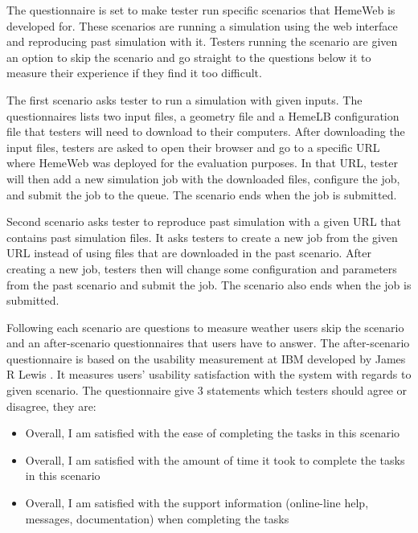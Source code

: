 The questionnaire is set to make tester run specific scenarios that HemeWeb is developed for. These scenarios are running a simulation using the web interface and reproducing past simulation with it. Testers running the scenario are given an option to skip the scenario and go straight to the questions below it to measure their experience if they find it too difficult. 

The first scenario asks tester to run a simulation with given inputs. The questionnaires lists two input files, a geometry file and a HemeLB configuration file that testers will need to download to their computers. After downloading the input files, testers are asked to open their browser and go to a specific URL where HemeWeb was deployed for the evaluation purposes. In that URL, tester will then add a new simulation job with the downloaded files, configure the job, and submit the job to the queue. The scenario ends when the job is submitted.

Second scenario asks tester to reproduce past simulation with a given URL that contains past simulation files. It asks testers to create a new job from the given URL instead of using files that are downloaded in the past scenario. After creating a new job, testers then will change some configuration and parameters from the past scenario and submit the job. The scenario also ends when the job is submitted.

Following each scenario are questions to measure weather users skip the scenario and an after-scenario questionnaires that users have to answer. The after-scenario questionnaire is based on the usability measurement at IBM developed by James R Lewis \citep{lewis1995ibm}.  It measures users' usability satisfaction with the system with regards to given scenario. The questionnaire give 3 statements which testers should agree or disagree, they are:

\begin{itemize}
	\item Overall, I am satisfied with the ease of completing the tasks in this scenario
	\item Overall, I am satisfied with the amount of time it took to complete the tasks in this scenario
	\item Overall, I am satisfied with the support information (online-line help, messages, documentation) when completing the tasks
\end{itemize}

